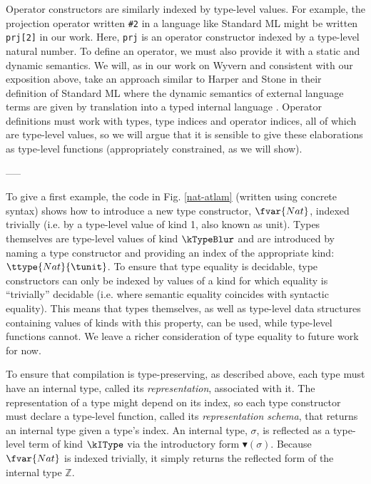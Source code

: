 Operator constructors are similarly indexed by type-level values. For example, the projection operator written \verb|#2| in a language like Standard ML might be written \verb|prj[2]| in our work. Here, \verb|prj| is an operator constructor indexed by a type-level natural number. 
To define an operator, we must also provide it with a static and dynamic semantics. We will, as in our work on Wyvern and consistent with our exposition above, take an approach similar to Harper and Stone in their definition of Standard ML where the dynamic semantics of external language terms are given by translation into a  typed internal language \cite{Harper00atype-theoretic}. Operator definitions must work with types, type indices and operator indices, all of which are type-level values, so we will argue that it is sensible to give these elaborations as type-level functions (appropriately constrained, as we will show). 

-----

To give a first example, the code in Fig. \ref{nat-atlam} (written using concrete syntax) shows how to introduce a new type constructor, $\fvar{Nat}$, indexed trivially (i.e. by a type-level value of kind 1, also known as unit). Types themselves are type-level values of kind $\kTypeBlur$ and are introduced by naming a type constructor and providing an index of the appropriate kind: $\ttype{Nat}{\tunit}$. To ensure that type equality is decidable, type constructors can only be indexed by values of a kind for which equality is ``trivially'' decidable (i.e. where semantic equality coincides with syntactic equality). This means that types themselves, as well as type-level data structures containing values of kinds with this property, can be used, while type-level functions cannot. We leave a richer consideration of type equality to future work for now.

To ensure that compilation is type-preserving, as described above, each type must have an internal type, called its \emph{representation}, associated with it. The representation of a type might depend on its index, so each type constructor must declare a type-level function, called its \emph{representation schema}, that returns an internal type given a type's index. An internal type, $\sigma$, is reflected as a type-level term of kind $\kIType$ via the introductory form $\blacktriangledown(\sigma)$. Because $\fvar{Nat}$ is indexed trivially, it simply returns the reflected form of the internal type $\mathbb{Z}$. %

